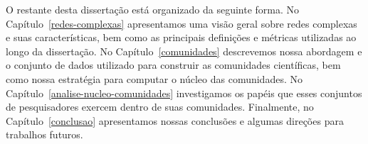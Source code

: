 O restante desta dissertação está organizado da seguinte forma. No Capítulo~\ref{redes-complexas} apresentamos uma visão geral sobre redes complexas e suas características, 
bem como as principais definições e métricas utilizadas ao longo da dissertação. No Capítulo~\ref{comunidades} descrevemos nossa abordagem e o conjunto de dados 
utilizado para construir as comunidades científicas, bem como nossa estratégia para computar o núcleo das comunidades. No Capítulo~\ref{analise-nucleo-comunidades} 
investigamos os papéis que esses conjuntos de pesquisadores exercem dentro de suas comunidades. Finalmente, no Capítulo~\ref{conclusao} apresentamos nossas conclusões e 
algumas direções para trabalhos futuros.

